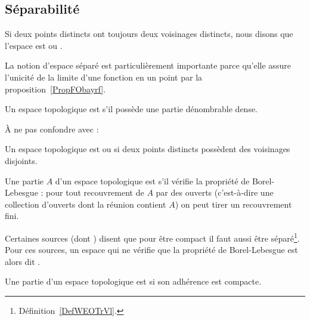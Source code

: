 \subsection{Séparabilité}

\begin{definition}  \label{DefYFmfjjm}
    Si deux points distincts ont toujours deux voisinages distincts, nous disons que l'espace est  ou .
\end{definition}
La notion d'espace séparé est particulièrement importante parce qu'elle assure l'unicité de la limite d'une fonction en un point par la proposition~\ref{PropFObayrf}.

\begin{definition}  \label{DefUADooqilFK}
    Un espace topologique est  s'il possède une partie dénombrable dense.
\end{definition}
À ne pas confondre avec :
\begin{definition}  \label{DefWEOTrVl}
    Un espace topologique est  ou  si deux points distincts possèdent des voisinages disjoints.
\end{definition}

\begin{definition}  \label{DefJJVsEqs}
  Une partie $A$ d'un espace topologique est  s'il vérifie la propriété de Borel-Lebesgue : pour tout recouvrement de $A$ par des ouverts (c'est-à-dire une collection d'ouverts dont la réunion contient $A$) on peut tirer un recouvrement fini.
\end{definition}
\begin{remark}
    Certaines sources (dont ) disent que pour être compact il faut aussi être séparé\footnote{Définition~\ref{DefWEOTrVl}.}. Pour ces sources, un espace qui ne vérifie que la propriété de Borel-Lebesgue est alors dit .
\end{remark}

\begin{definition}
    Une partie d'un espace topologique est  si son adhérence est compacte.
\end{definition}

